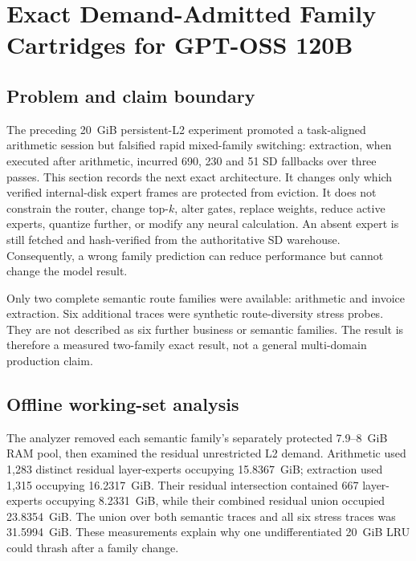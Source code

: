 
\section{Exact Demand-Admitted Family Cartridges for GPT-OSS 120B}
\label{sec:gptoss120b-exact-family-cartridges}

\subsection{Problem and claim boundary}

The preceding 20~GiB persistent-L2 experiment promoted a task-aligned
arithmetic session but falsified rapid mixed-family switching: extraction,
when executed after arithmetic, incurred 690, 230 and 51 SD fallbacks over
three passes.  This section records the next exact architecture.  It changes
only which verified internal-disk expert frames are protected from eviction.
It does not constrain the router, change top-$k$, alter gates, replace weights,
reduce active experts, quantize further, or modify any neural calculation.
An absent expert is still fetched and hash-verified from the authoritative SD
warehouse.  Consequently, a wrong family prediction can reduce performance
but cannot change the model result.

Only two complete semantic route families were available: arithmetic and
invoice extraction.  Six additional traces were synthetic route-diversity
stress probes.  They are not described as six further business or semantic
families.  The result is therefore a measured two-family exact result, not a
general multi-domain production claim.

\subsection{Offline working-set analysis}

The analyzer removed each semantic family's separately protected 7.9--8~GiB
RAM pool, then examined the residual unrestricted L2 demand.  Arithmetic used
1,283 distinct residual layer-experts occupying 15.8367~GiB; extraction used
1,315 occupying 16.2317~GiB.  Their residual intersection contained 667
layer-experts occupying 8.2331~GiB, while their combined residual union occupied
23.8354~GiB.  The union over both semantic traces and all six stress traces was
31.5994~GiB.  These measurements explain why one undifferentiated 20~GiB LRU
could thrash after a family change.

